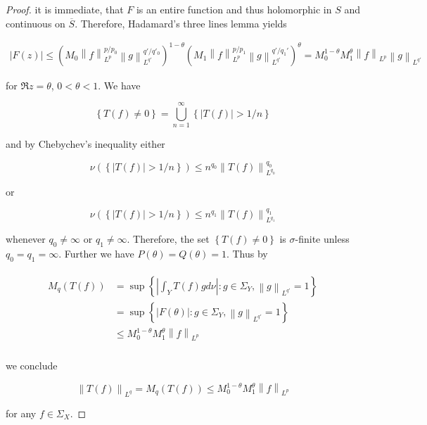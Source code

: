 \begin{proof}
	it is immediate, that $F$ is an entire function and thus holomorphic in $S$ and continuous on $\overline{S}$. Therefore, Hadamard's three lines lemma yields

\begin{gather*}
	\left| F(z) \right| \leqslant \left( M_0  \left\|f\right\|_{L^p}^{p/p_0} \left\|g\right\|_{L^{q'}}^{q'/q'_0} \right)^{1 - \theta}\left(  M_1 \left\|f\right\|_{L^p}^{p/p_1}\left\|g\right\|_{L^{q'}}^{q'/q_1'} \right)^\theta = M_0^{1 - \theta}M_1^\theta \left\|f\right\|_{L^p}\left\|g\right\|_{L^{q'}}
\end{gather*}

for $\Re z = \theta$, $0 < \theta < 1$. We have

\begin{equation*}
	\left\{ T(f) \neq 0\right\} = \bigcup_{n = 1}^\infty \left\{ \left| T(f)\right| > 1/n\right\}
\end{equation*}

and by Chebychev's inequality either

\begin{equation*}
	\nu\left( \left\{ \left| T(f)\right| > 1/n\right\} \right) \leqslant n^{q_0}\left\| T(f)\right\|_{L^{q_0}}^{q_0}
\end{equation*}

or

\begin{equation*}
	\nu\left( \left\{ \left| T(f)\right| > 1/n\right\} \right) \leqslant n^{q_1}\left\| T(f)\right\|_{L^{q_1}}^{q_1}
\end{equation*}

whenever $q_0 \neq \infty$ or $q_1 \neq \infty$. Therefore, the set $\left\{ T(f) \neq 0\right\}$ is $\sigma$-finite unless $q_0 = q_1 = \infty$. Further we have $P(\theta) = Q(\theta) = 1$. Thus by

\begin{gather*}
	\begin{aligned}
		M_q\left( T(f) \right) &= \sup\left\{\left| \int_Y T(f)gd\nu\right| : g \in \Sigma_Y, \left\|g\right\|_{L^{q'}} = 1\right\}\\
		&=  \sup\left\{\left| F(\theta)\right| : g \in \Sigma_Y, \left\|g\right\|_{L^{q'}} = 1\right\}\\
		&\leqslant M_0^{1 - \theta}M_1^\theta \left\|f\right\|_{L^p}\\
	\end{aligned}
\end{gather*}

we conclude 
	
\begin{equation*}
	\left\| T(f)\right\|_{L^q} = M_q\left( T(f) \right) \leqslant M_0^{1 - \theta}M_1^\theta \left\|f\right\|_{L^p}
\end{equation*}
	
for any $f \in \Sigma_X$.
\end{proof}

